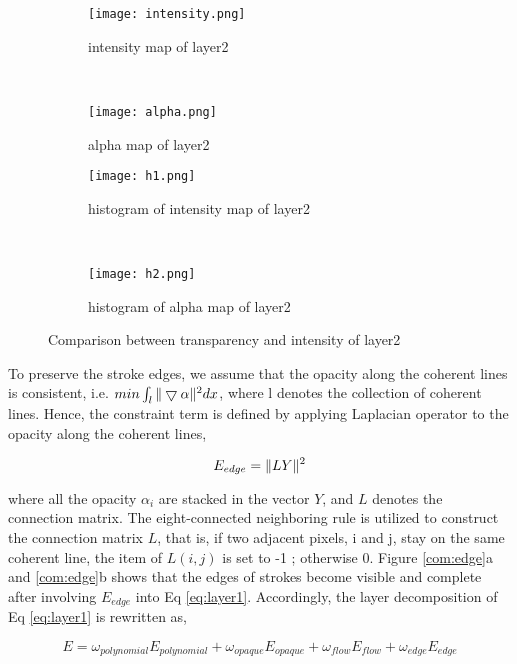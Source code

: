 \begin{figure}[H]
 		\centering
	\begin{subfigure}[b]{0.4\textwidth}
		\centering
		\texttt{[image: intensity.png]}
		\caption{intensity map of layer2}
	\end{subfigure}
	~
	\begin{subfigure}[b]{0.4\textwidth}
		\centering
		\texttt{[image: alpha.png]}
		\caption{alpha map of layer2}
	\end{subfigure}
 

 
	\centering
	\begin{subfigure}[b]{0.4\textwidth}
		\texttt{[image: h1.png]}
		\caption{histogram of intensity map of layer2}
	\end{subfigure}
	~  	
	\begin{subfigure}[b]{0.4\textwidth}
		\texttt{[image: h2.png]}
		\caption{histogram of alpha map of layer2}
	\end{subfigure}
	\caption{Comparison between transparency and intensity of layer2}
	\label{histo}
\end{figure}



 
To preserve the stroke edges, we assume that the opacity along the coherent lines is consistent, i.e. $min \int_{l}\Arrowvert \bigtriangledown\alpha \Arrowvert^2 dx $, where l denotes the collection of coherent lines. Hence, the constraint term is defined by applying Laplacian operator to the opacity along the coherent lines,

\begin{equation} 
E_{edge}=\Arrowvert LY \Arrowvert^2 
\end{equation} 

where all the opacity $\alpha_i$ are stacked in the vector $Y$, and $L$ denotes the connection matrix. The eight-connected neighboring rule is utilized to construct the connection matrix $L$, that is, if two adjacent pixels, i and j, stay on the same coherent line, the item of $L(i,j)$ is set to -1 ; otherwise 0. Figure \ref{com:edge}a and \ref{com:edge}b shows that the edges of strokes become visible and complete after involving $E_{edge}$ into Eq \ref{eq:layer1}.
Accordingly, the layer decomposition of Eq \ref{eq:layer1} is rewritten as,

\begin{equation}
E=\omega_{polynomial}E_{polynomial}+\omega_{opaque}E_{opaque}+\omega_{flow}E_{flow}+\omega_{edge}E_{edge}
\label{eq:layer_sum}
\end{equation} 

